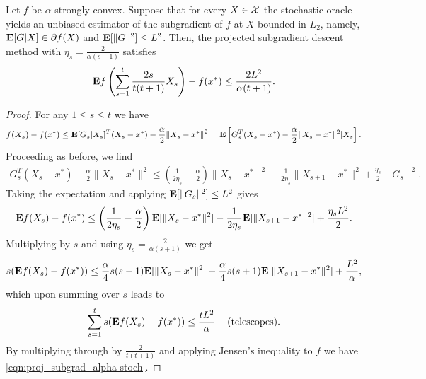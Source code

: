 \begin{theorem}
\label{thm:projectedgradalphastoch}
Let $f$ be $\alpha$-strongly convex. Suppose that for every $X \in \mathcal{X}$ the stochastic oracle yields an unbiased estimator of the subgradient of $f$ at $X$ bounded in $L_2$, namely, $\mathbf{E}[G |X]\in \partial f(X)$ and $\mathbf{E}[\|G\|^2] \leq L^2$. Then, the projected subgradient descent method with $\eta_s = \frac{2}{\alpha(s+1)}$ satisfies 
\begin{equation} \label{eqn:proj_subgrad_alpha stoch}
\mathbf{E} f\left( \sum_{s=1}^t \frac{2s}{t(t+1)}X_s \right) - f(x^*) \leq \frac{2L^2}{\alpha(t+1)}.
\end{equation}
\begin{proof}
For any $1 \leq s \leq t$ we have
\begin{align*}
	f(X_s) - f(x^*)
	\le \mathbf{E} [G_s|X_s]^T(X_s - x^*) - \frac{\alpha}{2}\|X_s - x^*\|^2
	= \mathbf{E} \left[G_s^T(X_s - x^*) - \frac{\alpha}{2}\|X_s - x^*\|^2 \large| X_s \right].
\end{align*}
Proceeding as before, we find
\begin{align*}
	G_s^T(X_s - x^*) - \frac{\alpha}{2}\|X_s - x^*\|^2
	\le \left( \frac{1}{2\eta_s} - \frac{\alpha}{2} \right) \|X_s - x^*\|^2 - \frac{1}{2\eta_s}\|X_{s+1} - x^*\|^2 + \frac{\eta_s}{2} \|G_s\|^2.
\end{align*}
Taking the expectation and applying $\mathbf{E}[\|G_s\|^2] \le L^2$ gives
\begin{align*}
	\mathbf{E} f(X_s) - f(x^*)
	\le \left( \frac{1}{2\eta_s} - \frac{\alpha}{2} \right) \mathbf{E}[\|X_s - x^*\|^2] - \frac{1}{2\eta_s}\mathbf{E} [\|X_{s+1} - x^*\|^2] + \frac{\eta_s L^2}{2}.
\end{align*}
Multiplying by $s$ and using $\eta_s = \frac{2}{\alpha(s+1)}$ we get
\begin{align*}
	s(\mathbf{E} f(X_s) - f(x^*))
	\le \frac{\alpha}{4}s(s-1) \mathbf{E}[\|X_s - x^*\|^2] - \frac{\alpha}{4}s(s+1) \mathbf{E} [\|X_{s+1} - x^*\|^2] + \frac{L^2}{\alpha},
\end{align*}
which upon summing over $s$ leads to
\[
\sum_{s=1}^t s(\mathbf{E} f(X_s) - f(x^*)) \le \frac{tL^2}{\alpha} + \text{(telescopes)}.
\]
By multiplying through by $\frac{2}{t(t+1)}$ and applying Jensen's inequality to $f$ we have \eqref{eqn:proj_subgrad_alpha stoch}.
\end{proof}
\end{theorem}



